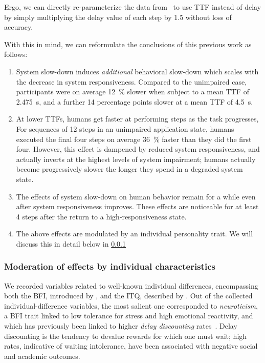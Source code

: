 Ergo, we can directly re-parameterize the data from~\cite{olguinmunoz:impact2021} to use \ac{TTF} instead of delay by simply multiplying the delay value of each step by \num{1.5} without loss of accuracy.

With this in mind, we can reformulate the conclusions of this previous work as follows:
\begin{enumerate}
    \item System slow-down induces \emph{additional} behavioral slow-down which scales with the decrease in system responsiveness.
    Compared to the unimpaired case, participants were on average \SI{12}{\percent} slower when subject to a mean \ac{TTF} of \SI{2.475}{\second}, and a further \num{14} percentage points slower at a mean \ac{TTF} of \SI{4.5}{\second}.

    \item\label{item:speedup} At lower \acp{TTF}, humans get faster at performing steps as the task progresses, 
    For sequences of \num{12} steps in an unimpaired application state, humans executed the final four steps on average \SI{36}{\percent} faster than they did the first four.
    However, this effect is dampened by reduced system responsiveness, and actually inverts at the highest levels of system impairment; humans actually become progressively slower the longer they spend in a degraded system state.

    \item\label{item:remain} The effects of system slow-down on human behavior remain for a while even after system responsiveness improves.
    These effects are noticeable for at least \num{4} steps after the return to a high-responsiveness state. 
    
    \item The above effects are modulated by an individual personality trait.
    We will discuss this in detail below in \cref{ssec:moderationeffects}
\end{enumerate}

\subsubsection{Moderation of effects by individual characteristics}\label{ssec:moderationeffects}

We recorded variables related to well-known individual differences, encompassing both the \acf{BFI}, introduced by \textcite{oliver:bfi1999}, and the \acf{ITQ}, described by \textcite{witmer1998measuring}.
Out of the collected individual-difference variables, the most salient one corresponded to \emph{neuroticism}, a \ac{BFI} trait linked to low tolerance for stress and high emotional reactivity, and which has previously been linked to higher \emph{delay discounting} rates~\cite{hirsh2008delay}.
Delay discounting is the tendency to devalue rewards for which one must wait; high rates, indicative of waiting intolerance, have been associated with negative social and academic outcomes.

